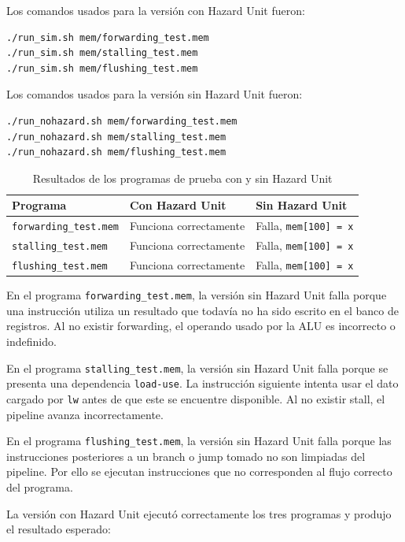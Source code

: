 Los comandos usados para la versión con Hazard Unit fueron:

\begin{verbatim}
./run_sim.sh mem/forwarding_test.mem
./run_sim.sh mem/stalling_test.mem
./run_sim.sh mem/flushing_test.mem
\end{verbatim}

Los comandos usados para la versión sin Hazard Unit fueron:

\begin{verbatim}
./run_nohazard.sh mem/forwarding_test.mem
./run_nohazard.sh mem/stalling_test.mem
./run_nohazard.sh mem/flushing_test.mem
\end{verbatim}

\begin{table}[h]
\centering
\caption{Resultados de los programas de prueba con y sin Hazard Unit}
\label{tab:hazard_tests}
\begin{tabular}{|l|l|l|}
\hline
\textbf{Programa} & \textbf{Con Hazard Unit} & \textbf{Sin Hazard Unit} \\
\hline
\texttt{forwarding\_test.mem} & Funciona correctamente & Falla, \texttt{mem[100] = x} \\
\hline
\texttt{stalling\_test.mem} & Funciona correctamente & Falla, \texttt{mem[100] = x} \\
\hline
\texttt{flushing\_test.mem} & Funciona correctamente & Falla, \texttt{mem[100] = x} \\
\hline
\end{tabular}
\end{table}

En el programa \texttt{forwarding\_test.mem}, la versión sin Hazard Unit falla porque una instrucción utiliza un resultado que todavía no ha sido escrito en el banco de registros. Al no existir forwarding, el operando usado por la ALU es incorrecto o indefinido.

En el programa \texttt{stalling\_test.mem}, la versión sin Hazard Unit falla porque se presenta una dependencia \texttt{load-use}. La instrucción siguiente intenta usar el dato cargado por \texttt{lw} antes de que este se encuentre disponible. Al no existir stall, el pipeline avanza incorrectamente.

En el programa \texttt{flushing\_test.mem}, la versión sin Hazard Unit falla porque las instrucciones posteriores a un branch o jump tomado no son limpiadas del pipeline. Por ello se ejecutan instrucciones que no corresponden al flujo correcto del programa.

La versión con Hazard Unit ejecutó correctamente los tres programas y produjo el resultado esperado:


